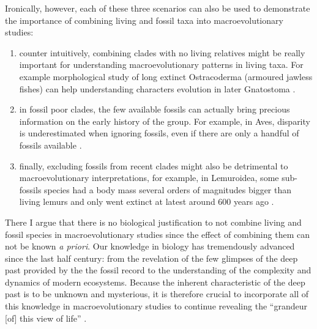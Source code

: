Ironically, however, each of these three scenarios can also be used to demonstrate the importance of combining living and fossil taxa into macroevolutionary studies:
\begin{enumerate}
\item counter intuitively, combining clades with no living relatives might be really important for understanding macroevolutionary patterns in living taxa. For example morphological study of long extinct Ostracoderma (armoured jawless fishes) can help understanding characters evolution in later Gnatostoma \citep[jawed vertebrates;][]{Janvier2015}.
\item in fossil poor clades, the few available fossils can actually bring precious information on the early history of the group. For example, in Aves, disparity is underestimated when ignoring fossils, even if there are only a handful of fossils available \citep[e.g. 58 fossil genera against 604 living ones;][]{Mitchell2015}.
\item finally, excluding fossils from recent clades might also be detrimental to macroevolutionary interpretations, for example, in Lemuroidea, some sub-fossils species had a body mass several orders of magnitudes bigger than living lemurs \citep{hartwig2002primate,Jungers2008} and only went extinct at latest around 600 years ago \citep{goodman2003introduction}.
\end{enumerate}

There I argue that there is no biological justification to not combine living and fossil species in macroevolutionary studies since the effect of combining them can not be known \textit{a priori}.
Our knowledge in biology has tremendously advanced since the last half century: from the revelation of the few glimpses of the deep past provided by the the fossil record to the understanding of the complexity and dynamics of modern ecosystems.
Because the inherent characteristic of the deep past is to be unknown and mysterious, it is therefore crucial to incorporate all of this knowledge in macroevolutionary studies to continue revealing the ``grandeur [of] this view of life'' \citep{darwin}.

%